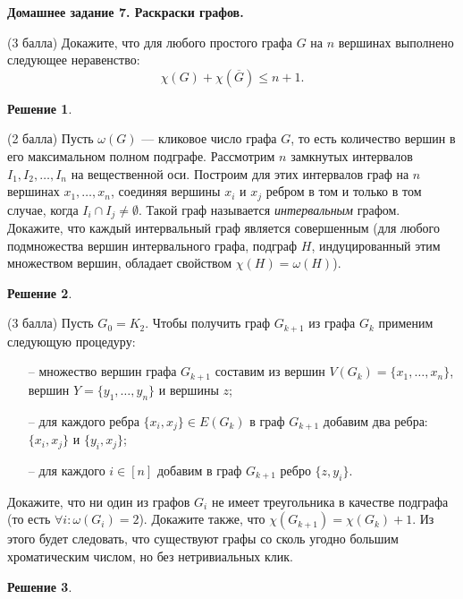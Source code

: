 \documentclass[12pt,fleqn,a4paper]{article}
\newtheorem*{solution}{Решение}
\newenvironment{task}[2] {
	\noindent\fbox{\bf {#1} {#2}.}
}{
}
\newcommand{\mytitle}[2] {
  \begin{center}
      \bf {#1} {#2}.
  \end{center}
}
\begin{document}
	\mytitle{Домашнее задание 7.}{Раскраски графов}
	\begin{task}{DM}{69}
		(3 балла)
		Докажите, что для любого простого графа $G$ на $n$ вершинах выполнено следующее неравенство:
		$$\chi(G) + \chi(\overline{G}) \leq n+1.$$
	\end{task}
	\begin{solution}
	\end{solution}

	\begin{task}{DM}{70}
		(2 балла) Пусть $\omega(G)$ — кликовое число графа $G$, то есть количество вершин в его максимальном полном подграфе.
		Рассмотрим $n$ замкнутых интервалов $I_1,I_2,\ldots,I_n$ на вещественной оси. 
		Построим для этих интервалов граф на $n$ вершинах $x_1, \dots, x_n$, соединяя вершины $x_i$ и $x_j$ ребром в том и только в том случае, 
		когда $I_i \cap I_j \neq \emptyset$. Такой граф называется \emph{интервальным} графом. Докажите, что каждый интервальный граф является совершенным
		(для любого подмножества вершин интервального графа, подграф $H$, индуцированный этим множеством вершин, обладает свойством $\chi(H)=\omega(H)$).
	\end{task}
	\begin{solution}
	\end{solution}

	\begin{task}{DM}{71}
		(3 балла)
		        Пусть $G_0=K_2$. Чтобы получить граф $G_{k+1}$ из графа $G_k$ применим следующую процедуру:
		
		        \begin{itemize}
		                \item[--] множество вершин графа $G_{k+1}$ составим из вершин $V(G_k)=\{x_1,\ldots,x_n\}$, вершин $Y=\{y_1,\ldots,y_n\}$ и вершины $z$;
		                \item[--] для каждого ребра $ \{x_i,x_j\} \in E(G_k)$ в граф $G_{k+1}$ добавим два ребра: $\{x_i,x_j\}$ и $\{y_i,x_j\}$;
		                \item[--] для каждого $i \in [n]$ добавим в граф $G_{k+1}$ ребро $\{z,y_i\}.$ 
		        \end{itemize}
		        Докажите, что ни один из графов $G_i$ не имеет треугольника в качестве подграфа (то есть $\forall i : \omega(G_i) = 2$). Докажите также, что $\chi(G_{k+1})=\chi(G_{k}) + 1$.
		        Из этого будет следовать, что существуют графы со сколь угодно большим хроматическим числом, но без нетривиальных клик.
	\end{task}
	\begin{solution}
	\end{solution}
\end{document}
